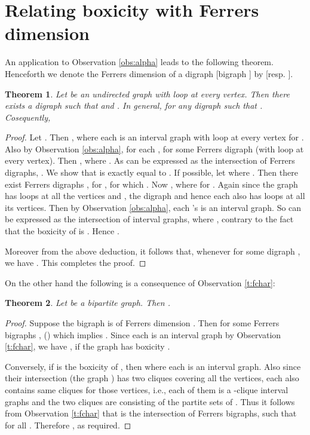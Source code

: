\documentclass[11pt]{article}
\newtheorem{thm}{Theorem}[section]
\theoremstyle{definition}
\theoremstyle{remark}
\numberwithin{equation}{section}
\begin{document}
\section{Relating boxicity with Ferrers dimension}

An application to Observation \ref{obs:alpha} leads to the following theorem. Henceforth we denote the Ferrers dimension of a digraph  [bigraph ] by  [resp. ].

\begin{thm} \label{thm:alpha}
Let  be an undirected graph with loop at every vertex. Then there exists a digraph  such that  and . In general,  for any digraph  such that . Cosequently, 

\end{thm}

\begin{proof}Let . Then , where each  is an interval graph with loop at every vertex for . Also by Observation \ref{obs:alpha}, for each ,  for some Ferrers digraph  (with loop at every vertex). Then , where . As  can be expressed as the intersection of  Ferrers digraphs, . We show that  is exactly equal to . If possible, let  where . Then there exist Ferrers digraphs , for , for which . Now , where  for . Again since the graph  has loops at all the vertices and , the digraph  and hence each  also has loops at all its vertices. Then by Observation \ref{obs:alpha}, each 's is an interval graph. So  can be expressed as the intersection of  interval graphs, where , contrary to the fact that the boxicity of  is . Hence .

\vspace{1em} Moreover from the above deduction, it follows that, whenever  for some digraph , we have . This completes the proof.
\end{proof}

On the other hand the following is a consequence of Observation \ref{t:fchar}:

\begin{thm}
Let  be a bipartite graph. Then .
\end{thm}

\begin{proof}
Suppose the bigraph  is of Ferrers dimension . Then  for some Ferrers bigraphs , {\small ()} which implies . Since each  is an interval graph by Observation \ref{t:fchar}, we have , if the graph  has boxicity . 

\vspace{1em} Conversely, if  is the boxicity of , then  where each  is an interval graph. Also since their intersection (the graph ) has two cliques covering all the vertices, each  also contains same cliques for those vertices, i.e., each of them is a -clique interval graphs and the two cliques are consisting of the partite sets of . Thus it follows from Observation \ref{t:fchar} that  is the intersection of  Ferrers bigraphs,  such that  for all . Therefore , as required.
\end{proof}
\end{document}
